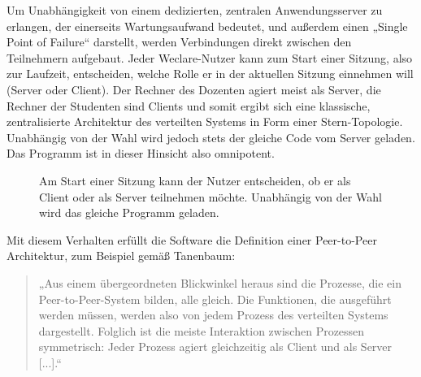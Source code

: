 Um Unabhängigkeit von einem dedizierten, zentralen Anwendungsserver zu erlangen, der einerseits Wartungsaufwand bedeutet, und außerdem einen „Single Point of Failure“ darstellt, werden Verbindungen direkt zwischen den Teilnehmern aufgebaut. Jeder Weclare-Nutzer kann zum Start einer Sitzung, also zur Laufzeit, entscheiden, welche Rolle er in der aktuellen Sitzung einnehmen will (Server oder Client). Der Rechner des Dozenten agiert meist als Server, die Rechner der Studenten sind Clients und somit ergibt sich eine klassische, zentralisierte Architektur des verteilten Systems in Form einer Stern-Topologie. Unabhängig von der Wahl wird jedoch stets der gleiche Code vom Server geladen. Das Programm ist in dieser Hinsicht also omnipotent.

\begin{figure}[H]
    \centering
    \setlength{\fboxsep}{0pt}
    \setlength{\fboxrule}{0.5pt}
    \caption[Start einer neuen Weclare-Sitzung]{Am Start einer Sitzung kann der Nutzer entscheiden, ob er als Client oder als Server teilnehmen möchte. Unabhängig von der Wahl wird das gleiche Programm geladen.}
    \label{abb:weclare_start}
\end{figure}

Mit diesem Verhalten erfüllt die Software die Definition einer Peer-to-Peer Architektur, zum Beispiel gemäß Tanenbaum\cite[S.62]{book:tanenbaum}:

\begin{quotation}
„Aus einem übergeordneten Blickwinkel heraus sind die Prozesse, die ein Peer-to-Peer-System bilden, alle gleich. Die Funktionen, die ausgeführt werden müssen, werden also von jedem Prozess des verteilten Systems dargestellt. Folglich ist die meiste Interaktion zwischen Prozessen symmetrisch: Jeder Prozess agiert gleichzeitig als Client und als Server [...].“
\end{quotation}

